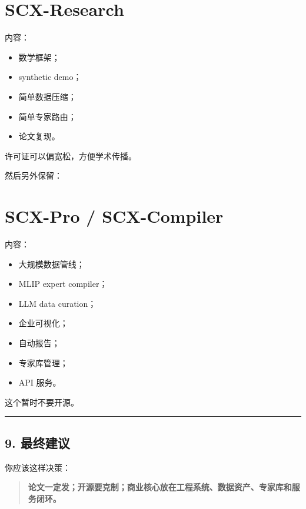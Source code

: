 \documentclass[
  12pt,
]{ctexart}
\providecommand{\tightlist}{%
  \setlength{\itemsep}{0pt}\setlength{\parskip}{0pt}}
\begin{document}
\section{\texorpdfstring{\textbf{SCX-Research}}{SCX-Research}}\label{scx-research}

内容：

\begin{itemize}
\tightlist
\item
  数学框架；
\item
  synthetic demo；
\item
  简单数据压缩；
\item
  简单专家路由；
\item
  论文复现。
\end{itemize}

许可证可以偏宽松，方便学术传播。

然后另外保留：

\section{\texorpdfstring{\textbf{SCX-Pro /
SCX-Compiler}}{SCX-Pro / SCX-Compiler}}\label{scx-pro-scx-compiler}

内容：

\begin{itemize}
\tightlist
\item
  大规模数据管线；
\item
  MLIP expert compiler；
\item
  LLM data curation；
\item
  企业可视化；
\item
  自动报告；
\item
  专家库管理；
\item
  API 服务。
\end{itemize}

这个暂时不要开源。

\begin{center}\rule{0.5\linewidth}{0.5pt}\end{center}

\subsection{9. 最终建议}\label{ux6700ux7ec8ux5efaux8bae}

你应该这样决策：

\begin{quote}
\textbf{论文一定发；开源要克制；商业核心放在工程系统、数据资产、专家库和服务闭环。}
\end{quote}
\end{document}
